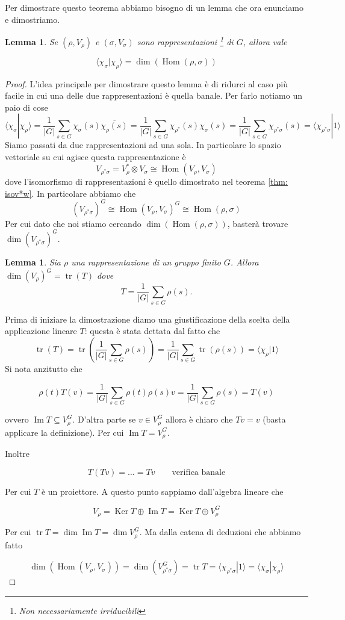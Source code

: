 \documentclass[11pt]{article}
\theoremstyle{plain}
\newtheorem{lemma}[thm]{Lemma}
\theoremstyle{definition}
\theoremstyle{remark}
\newcommand{\dsum}{\displaystyle\sum}
\DeclareMathOperator{\tr}{tr}
\DeclareMathOperator{\Hom}{Hom}
\DeclareMathOperator{\Ker}{Ker}
\DeclareMathOperator{\Imm}{Im}
\begin{document}
Per dimostrare questo teorema abbiamo bisogno di un lemma che ora enunciamo e dimostriamo.




\begin{lemma}
Se $(\rho, V_\rho)$ e $(\sigma, V_\sigma)$ sono rappresentazioni \footnote{Non necessariamente irriducibili} di $G$, allora vale

\[ \langle \chi_\sigma | \chi_\rho \rangle  = \dim(\Hom (\rho, \sigma))\] 
\label{lemma relazioni ortogonalita}
\end{lemma}
\begin{proof}
L'idea principale per dimostrare questo lemma è di ridurci al caso più facile in cui una delle due rappresentazioni è quella banale. Per farlo notiamo un paio di cose
\[ \langle \chi_\sigma | \chi_\rho \rangle = \dfrac{1}{|G|} \dsum_{s\in G} \chi_\sigma(s) \overline{\chi_\rho(s)} = \dfrac{1}{|G|} \dsum_{s\in G} {\chi_{\rho^*}(s)} \chi_{\sigma}(s) = \dfrac{1}{|G|} \dsum_{s\in G} \chi_{\rho^*\sigma}(s)  = \langle \chi_{\rho^*\sigma}  | 1 \rangle\]
Siamo passati da due rappresentazioni ad una sola. In particolare lo spazio vettoriale su cui agisce questa rappresentazione è 
\[ V_{\rho^* \sigma} = V_{\rho}^* \otimes V_\sigma \cong \Hom(V_\rho, V_\sigma)\]
dove l'isomorfismo di rappresentazioni è quello dimostrato nel teorema \ref{thm: isov*w}.
In particolare abbiamo che
\[ (V_{\rho^*\sigma})^G \cong \Hom(V_\rho, V_\sigma)^G \cong \Hom(\rho, \sigma)\]
Per cui dato che noi stiamo cercando $\dim(\Hom(\rho, \sigma))$, basterà trovare $\dim(V_{\rho^*\sigma})^G$.
\begin{lemma}
Sia $\rho$ una rappresentazione di un gruppo finito $G$. Allora
$\dim(V_{\rho})^G=\tr(T)$ dove
\[ T = \dfrac{1}{|G|} \dsum_{s\in G} \rho(s).\]
\end{lemma}

Prima di iniziare la dimostrazione diamo una giustificazione della scelta della applicazione lineare $T$: questa è stata dettata dal fatto che
\[ \tr(T)=\tr\left(\dfrac{1}{|G|} \dsum_{s\in G} \rho(s)\right)= \dfrac{1}{|G|} \dsum_{s\in G} \tr(\rho(s))= \langle \chi_\rho| 1 \rangle \]
Si nota anzitutto che 

\[ \rho(t) T(v) = \dfrac{1}{|G|} \dsum_{s\in G} \rho(t)\rho(s) v = \dfrac{1}{|G|} \dsum_{s\in G} \rho(s) = T(v)\]

ovvero $\Imm T\subseteq V_\rho^G$. D'altra parte se $v \in V_\rho^G$ allora è chiaro che $Tv = v$ (basta applicare la definizione). Per cui $\Imm T = V_\rho^G$. 

Inoltre 

\[T(Tv) = \ldots = Tv \qquad \text{verifica banale}\]

Per cui $T$ è un proiettore. A questo punto sappiamo dall'algebra lineare che

\[ V_\rho = \Ker T \oplus \Imm T = \Ker T \oplus V_\rho^G\]

Per cui $\tr T = \dim \Imm T = \dim V_\rho^G$. Ma dalla catena di deduzioni che abbiamo fatto

\[\dim(\Hom(V_\rho, V_\sigma)) = \dim(V_{\rho^*\sigma}^G) = \tr T = \langle \chi_{\rho^*\sigma} | 1 \rangle = \langle \chi_\sigma | \chi_\rho \rangle\]

\end{proof}
\end{document}
